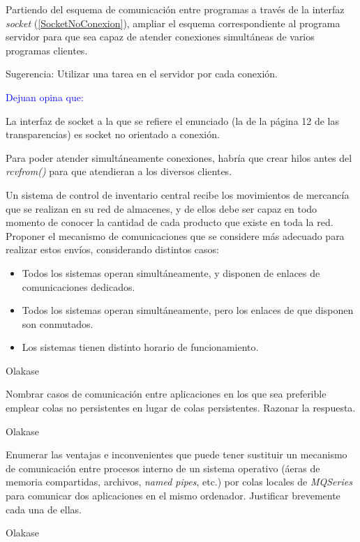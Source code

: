   \begin{problem}[6]
  Partiendo del esquema de comunicación entre programas a través de la
interfaz \textit{socket} (\ref{SocketNoConexion}), ampliar el esquema correspondiente al programa servidor para que sea capaz de atender conexiones simultáneas de varios programas clientes.

Sugerencia: Utilizar una tarea en el servidor por cada conexión.
  \solution

\textcolor{blue}{Dejuan opina que:} 

La interfaz de socket a la que se refiere el enunciado (la de la página 12 de las transparencias) es socket no orientado a conexión. 

Para poder atender simultáneamente conexiones, habría que crear hilos antes del \textit{rcvfrom()} para que atendieran a los diversos clientes.


  \end{problem}

  \begin{problem}[7]
  Un sistema de control de inventario central recibe los movimientos de
mercancía que se realizan en su red de almacenes, y de ellos debe ser capaz en
todo momento de conocer la cantidad de cada producto que existe en toda la red.
Proponer el mecanismo de comunicaciones que se considere más adecuado para
realizar estos envíos, considerando distintos casos:
  \begin{itemize}
    \item Todos los sistemas operan simultáneamente, y disponen de enlaces de
comunicaciones dedicados.
    \item Todos los sistemas operan simultáneamente, pero los enlaces de que disponen
son conmutados.
    \item Los sistemas tienen distinto horario de funcionamiento.
   \end{itemize}
    \solution

    Olakase

    \end{problem}

  \begin{problem}[8]
  Nombrar casos de comunicación entre aplicaciones en los que sea
preferible emplear colas no persistentes en lugar de colas persistentes.
Razonar la respuesta.
  \solution

  Olakase

  \end{problem}

  \begin{problem}[9]
  Enumerar las ventajas e inconvenientes que puede tener sustituir un mecanismo
  de comunicación entre procesos interno de un sistema operativo (áeras
  de memoria compartidas, archivos, \textit{named pipes}, etc.) por colas locales
de \textit{MQSeries} para comunicar dos aplicaciones en el mismo ordenador.
Justificar brevemente cada una de ellas.
  \solution

  Olakase

  \end{problem}

